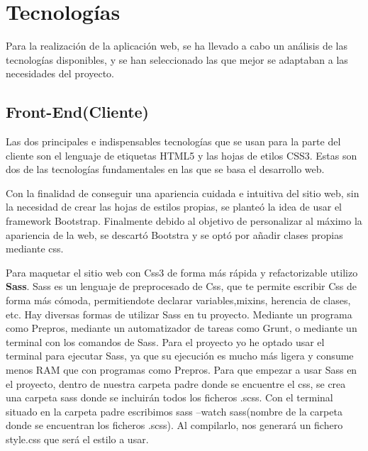 \section{Tecnologías}

Para la realización de la aplicación web, se ha llevado a cabo un análisis de las tecnologías disponibles, y se han seleccionado las que mejor se adaptaban a las necesidades del proyecto.

\subsection{Front-End(Cliente)}

Las dos principales e indispensables tecnologías que se usan para la parte del cliente son el lenguaje de etiquetas HTML5 y las hojas de etilos CSS3. Estas son dos de las tecnologías fundamentales en las que se basa el desarrollo web.

 \vspace{5 mm}

 Con la finalidad de conseguir una apariencia cuidada e intuitiva del sitio web, sin la necesidad de crear las hojas de estilos propias, se planteó la idea de usar el framework Bootstrap. Finalmente debido al objetivo de personalizar al máximo la apariencia de la web, se descartó Bootstra y se optó por añadir clases propias mediante css.

\vspace{5 mm}

Para maquetar el sitio web con Css3 de forma más rápida y refactorizable utilizo \textbf{Sass}. Sass es un lenguaje de preprocesado de Css, que te permite escribir Css de forma más cómoda, permitiendote declarar variables,mixins, herencia de clases, etc. Hay diversas formas de utilizar Sass en tu proyecto. Mediante un programa como Prepros, mediante un automatizador de tareas como Grunt, o mediante un terminal con los comandos de Sass. Para el proyecto yo he optado usar el terminal para ejecutar Sass, ya que su ejecución es mucho más ligera y consume menos RAM que con programas como Prepros. Para que empezar a usar Sass en el proyecto, dentro de nuestra carpeta padre donde se encuentre el css, se crea una carpeta sass donde se incluirán todos los ficheros .scss. Con el terminal situado en la carpeta padre escribimos sass --watch sass(nombre de la carpeta donde se encuentran los ficheros .scss). Al compilarlo, nos generará un fichero style.css que será el estilo a usar.

\vspace{5 mm}

